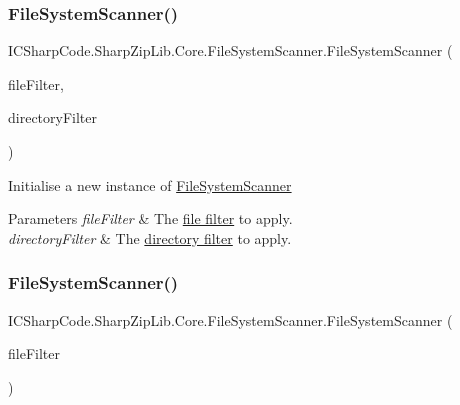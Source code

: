\subsubsection{\texorpdfstring{File\+System\+Scanner()}{FileSystemScanner()}\hspace{0.1cm}{\footnotesize\ttfamily [2/4]}}
{\footnotesize\ttfamily I\+C\+Sharp\+Code.\+Sharp\+Zip\+Lib.\+Core.\+File\+System\+Scanner.\+File\+System\+Scanner (\begin{DoxyParamCaption}\item[{string}]{file\+Filter,  }\item[{string}]{directory\+Filter }\end{DoxyParamCaption})\hspace{0.3cm}{\ttfamily [inline]}}



Initialise a new instance of \hyperlink{class_i_c_sharp_code_1_1_sharp_zip_lib_1_1_core_1_1_file_system_scanner}{File\+System\+Scanner} 


\begin{DoxyParams}{Parameters}
{\em file\+Filter} & The \hyperlink{class_i_c_sharp_code_1_1_sharp_zip_lib_1_1_core_1_1_path_filter}{file filter} to apply.\\
\hline
{\em directory\+Filter} & The \hyperlink{class_i_c_sharp_code_1_1_sharp_zip_lib_1_1_core_1_1_path_filter}{directory filter} to apply.\\
\hline
\end{DoxyParams}
\mbox{\label{class_i_c_sharp_code_1_1_sharp_zip_lib_1_1_core_1_1_file_system_scanner_a21b4fc424cea246c1bea985c118d077a}} 
\subsubsection{\texorpdfstring{File\+System\+Scanner()}{FileSystemScanner()}\hspace{0.1cm}{\footnotesize\ttfamily [3/4]}}
{\footnotesize\ttfamily I\+C\+Sharp\+Code.\+Sharp\+Zip\+Lib.\+Core.\+File\+System\+Scanner.\+File\+System\+Scanner (\begin{DoxyParamCaption}\item[{\hyperlink{interface_i_c_sharp_code_1_1_sharp_zip_lib_1_1_core_1_1_i_scan_filter}{I\+Scan\+Filter}}]{file\+Filter }\end{DoxyParamCaption})\hspace{0.3cm}{\ttfamily [inline]}}



